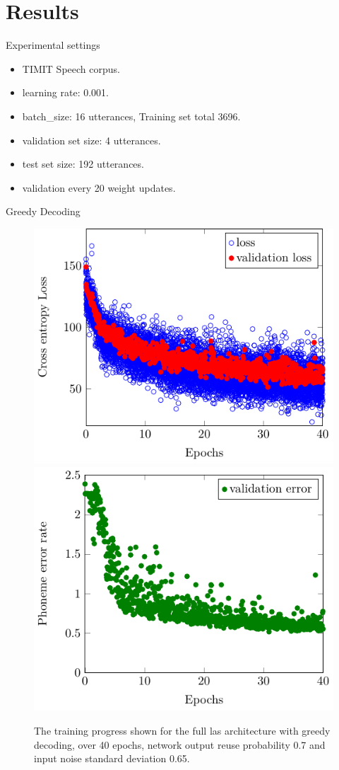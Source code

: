 \documentclass[10pt]{beamer}
\begin{document}
\section{Results}

\begin{frame}{Experimental settings}

\begin{itemize}
	\item TIMIT Speech corpus.
	\item learning rate: 0.001.
	\item batch\_size: 16 utterances, Training set total 3696.
	\item validation set size: 4 utterances.
	\item test set size: 192 utterances.
	\item validation every 20 weight updates.
\end{itemize}

\end{frame}


\begin{frame}{Greedy Decoding}
	\begin{figure}
	\includegraphics[width=0.49\linewidth]{../tikz/LAS_no_reg_e40_p07_loss}
	\includegraphics[width=0.49\linewidth]{../tikz/LAS_no_reg_e40_p07_error}
	\caption{The training progress shown for the full las architecture with greedy decoding, over 40 epochs, network output reuse probability 0.7 and input noise standard deviation 0.65.}
	\label{fig:lasGreedy}
	\end{figure}
\end{frame}
\end{document}
